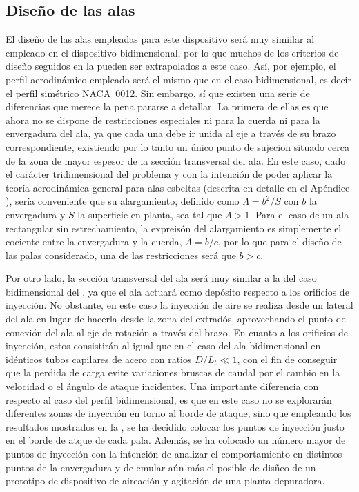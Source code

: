 \subsection{Diseño de las alas}

El diseño de las alas empleadas para este dispositivo será muy simiilar al empleado en el dispositivo bidimensional, por lo que muchos de los criterios de diseño seguidos en la  pueden ser extrapolados a este caso. Así, por ejemplo, el perfil aerodinámico empleado será el mismo que en el caso bidimensional, es decir el perfil simétrico NACA~0012. Sin embargo, sí que existen una serie de diferencias que merece la pena pararse a detallar. La primera de ellas es que ahora no se dispone de restricciones especiales ni para la cuerda ni para la envergadura del ala, ya que cada una debe ir unida al eje a través de su brazo correspondiente, existiendo por lo tanto un único punto de sujecion situado cerca de la zona de mayor espesor de la sección transversal del ala. En este caso, dado el carácter tridimensional del problema y con la intención de poder aplicar la teoría aerodinámica general para alas esbeltas (descrita en detalle en el Apéndice %
), sería conveniente que su alargamiento, definido como $\Lambda = b^{2}/S$ con $b$ la envergadura y $S$ la superficie en planta, sea tal que $\Lambda > 1$. Para el caso de un ala rectangular sin estrechamiento, la expreisón del alargamiento es simplemente el cociente entre la envergadura y la cuerda, $\Lambda = b/c$, por lo que para el diseño de las palas considerado, una de las restricciones será que $b > c$.

Por otro lado, la sección transversal del ala será muy similar a la del caso bidimensional del , ya que el ala actuará como depósito respecto a los orificios de inyección. No obstante, en este caso la inyección de aire se realiza desde un lateral del ala en lugar de hacerla desde la zona del extradós, aprovechando el punto de conexión del ala al eje de rotación a través del brazo. En cuanto a los orificios de inyección, estos consistirán al igual que en el caso del ala bidimensional en idénticos tubos capilares de acero con ratios $D/L_{t} \ll 1$, con el fin de conseguir que la perdida de carga evite variaciones bruscas de caudal por el cambio en la velocidad o el ángulo de ataque incidentes. Una importante diferencia con respecto al caso del perfil bidimensional, es que en este caso no se explorarán diferentes zonas de inyección en torno al borde de ataque, sino que empleando los resultados mostrados en la , se ha decidido colocar los puntos de inyección justo en el borde de atque de cada pala. Además, se ha colocado un número mayor de puntos de inyección con la intención de analizar el comportamiento en distintos puntos de la envergadura y de emular aún más el posible de disñeo de un prototipo de dispositivo de aireación y agitación de una planta depuradora. 

